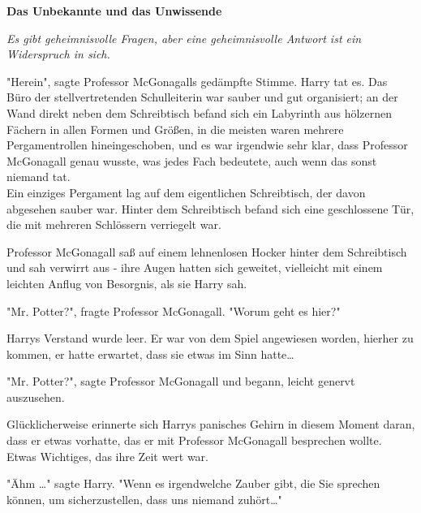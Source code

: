 

\hypertarget{das-unbekannte-und-das-unwissende}{%

\textbf{Das Unbekannte und das Unwissende}

\emph{Es gibt geheimnisvolle Fragen, aber eine geheimnisvolle Antwort ist ein Widerspruch in sich.}

"Herein", sagte Professor McGonagalls gedämpfte Stimme. Harry tat es. Das Büro der stellvertretenden Schulleiterin war sauber und gut organisiert; an der Wand direkt neben dem Schreibtisch befand sich ein Labyrinth aus hölzernen Fächern in allen Formen und Größen, in die meisten waren mehrere Pergamentrollen hineingeschoben, und es war irgendwie sehr klar, dass Professor McGonagall genau wusste, was jedes Fach bedeutete, auch wenn das sonst niemand tat.\\ Ein einziges Pergament lag auf dem eigentlichen Schreibtisch, der davon abgesehen sauber war. Hinter dem Schreibtisch befand sich eine geschlossene Tür, die mit mehreren Schlössern verriegelt war.

Professor McGonagall saß auf einem lehnenlosen Hocker hinter dem Schreibtisch und sah verwirrt aus - ihre Augen hatten sich geweitet, vielleicht mit einem leichten Anflug von Besorgnis, als sie Harry sah.

"Mr. Potter?", fragte Professor McGonagall. "Worum geht es hier?"

Harrys Verstand wurde leer. Er war von dem Spiel angewiesen worden, hierher zu kommen, er hatte erwartet, dass sie etwas im Sinn hatte…

"Mr. Potter?", sagte Professor McGonagall und begann, leicht genervt auszusehen.

Glücklicherweise erinnerte sich Harrys panisches Gehirn in diesem Moment daran, dass er etwas vorhatte, das er mit Professor McGonagall besprechen wollte.\\ Etwas Wichtiges, das ihre Zeit wert war.

"Ähm …" sagte Harry. "Wenn es irgendwelche Zauber gibt, die Sie sprechen können, um sicherzustellen, dass uns niemand zuhört…"

}
